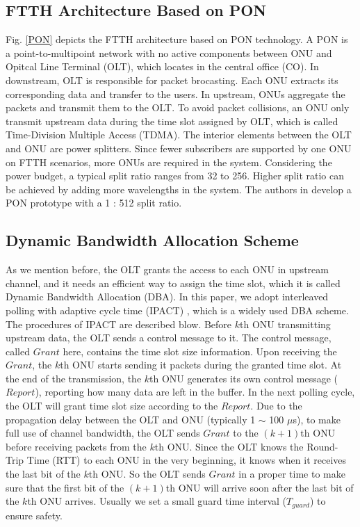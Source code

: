 \documentclass[journal]{IEEEtran}
\begin{document}
\subsection{FTTH Architecture Based on PON}
Fig. \ref{PON} depicts the FTTH architecture based on PON technology. A PON is a point-to-multipoint network with no active components between ONU and Opitcal Line Terminal (OLT), which locates in the central office (CO). In downstream, OLT is responsible for packet brocasting. Each ONU extracts its corresponding data and transfer to the users. In upstream, ONUs aggregate the packets and transmit them to the OLT. To avoid packet collisions, an ONU only transmit upstream data during the time slot assigned by OLT, which is called Time-Division Multiple Access (TDMA). The interior elements between the OLT and ONU are power splitters. Since fewer subscribers are supported by one ONU on FTTH scenarios, more ONUs are required in the system. Considering the power budget, a typical split ratio ranges from 32 to 256. Higher split ratio can be achieved by adding more wavelengths in the system. The authors in \cite{luo2013time} develop a PON prototype with a 1 : 512 split ratio.

\subsection{Dynamic Bandwidth Allocation Scheme}
As we mention before, the OLT grants the access to each ONU in upstream channel, and it needs an efficient way to assign the time slot, which it is called Dynamic Bandwidth Allocation (DBA). In this paper, we adopt interleaved polling with adaptive cycle time (IPACT) \cite{983911}, which is a widely used DBA scheme. The procedures of IPACT are described blow. Before $k$th ONU transmitting upstream data, the OLT sends a control message to it. The control message, called $Grant$ here, contains the time slot size information. Upon receiving the $Grant$, the $k$th ONU starts sending it packets during the granted time slot. At the end of the transmission, the $k$th ONU generates its own control message ($Report$), reporting how many data are left in the buffer. In the next polling cycle, the OLT will grant time slot size according to the $Report$. Due to the propagation delay between the OLT and ONU (typically 1 $\sim$ 100 $\mu$s), to make full use of channel bandwidth, the OLT sends $Grant$ to the $(k + 1)$th ONU before receiving packets from the $k$th ONU. Since the OLT knows the Round-Trip Time (RTT) to each ONU in the very beginning, it knows when it receives the last bit of the $k$th ONU. So the OLT sends $Grant$ in a proper time to make sure that the first bit of the $(k + 1)$th ONU will arrive soon after the last bit of the $k$th ONU arrives. Usually we set a small guard time interval ($T_{guard}$) to ensure safety.
\end{document}
